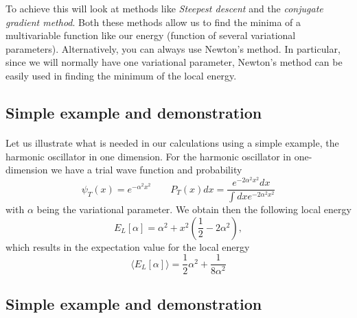 \documentclass[%
oneside,                 %
final,                   %
10pt]{article}
\begin{document}
\noindent
To achieve this will look at methods like \emph{Steepest descent} and the \emph{conjugate gradient method}. Both these methods allow us to find
the minima of a multivariable  function like our energy (function of several variational parameters). 
Alternatively, you can always use Newton's method. In particular, since we will normally have one variational parameter,
Newton's method can be easily used in finding the minimum of the local energy.



\subsection{Simple example and demonstration}

\paragraph{}
Let us illustrate what is needed in our calculations using a simple example, the harmonic oscillator in one dimension.
For the harmonic oscillator in one-dimension we have a  trial wave function and probability
\begin{equation*}
\psi_T(x) = e^{-\alpha^2 x^2} \qquad P_T(x)dx = \frac{e^{-2\alpha^2 x^2}dx}{\int dx e^{-2\alpha^2 x^2}}
\end{equation*}
with $\alpha$ being the variational parameter. 
We obtain then the following local energy
\begin{equation*}
E_L[\alpha] = \alpha^2+x^2\left(\frac{1}{2}-2\alpha^2\right),
\end{equation*}
which results in the expectation value for the local energy
\begin{equation*}
\langle  E_L[\alpha]\rangle = \frac{1}{2}\alpha^2+\frac{1}{8\alpha^2}
\end{equation*}





\subsection{Simple example and demonstration}

\end{document}
